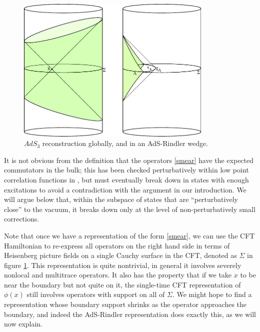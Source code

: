 \documentclass[12pt]{article}
\begin{document}
\begin{figure}
\begin{center}
\includegraphics[height=7cm]{globalfig.pdf}
\caption{$AdS_3$ reconstruction globally, and in an AdS-Rindler wedge.}\label{globalfig}
\end{center}
\end{figure}

It is not obvious from the definition that the operators \eqref{smear} have the expected commutators in the bulk; this has been checked perturbatively within low point correlation functions in \cite{Kabat:2011rz}, but must eventually break down in states with enough excitations to avoid a contradiction with the argument in our introduction.  We will argue below that, within the subspace of states that are ``perturbatively close'' to the vacuum, it breaks down only at the level of non-perturbatively small corrections.  


Note that once we have a representation of the form \eqref{smear}, we can use the CFT Hamiltonian to re-express all operators on the right hand side in terms of Heisenberg picture fields on a single Cauchy surface in the CFT, denoted as $\Sigma$ in figure \ref{globalfig}.  This representation is quite nontrivial, in general it involves severely nonlocal and multitrace operators.  It also has the property that if we take $x$ to be near the boundary but not quite on it, the single-time CFT representation of $\phi(x)$ still involves operators with support on all of $\Sigma$.  We might hope to find a representation whose boundary support shrinks as the operator approaches the boundary, and indeed the AdS-Rindler representation does exactly this, as we will now explain.  
\end{document}

